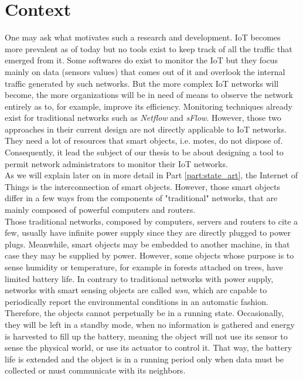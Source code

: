 \section*{Context}

One may ask what motivates such a research and development. IoT becomes more prevalent as of today but no tools exist to keep track of all the traffic that emerged from it. Some softwares do exist to monitor the IoT but they focus mainly on data (sensors values) that comes out of it and overlook the internal traffic generated by such networks. But the more complex IoT networks will become, the more organizations will be in need of means to observe the network entirely as to, for example, improve its efficiency. Monitoring techniques already exist for traditional networks such as \textit{Netflow} and \textit{sFlow}. However, those two approaches in their current design are not directly applicable to IoT networks. They need a lot of resources that smart objects, i.e. motes, do not dispose of. Consequently, it lead the subject of our thesis to be about designing a tool to permit network administrators to monitor their IoT networks.\\

As we will explain later on in more detail in Part \ref{part:state_art}, the Internet of Things is the interconnection of smart objects. However, those smart objects differ in a few ways from the components of "traditional" networks, that are mainly composed of powerful computers and routers.\\

Those traditional networks, composed by computers, servers and routers to cite a few, usually have infinite power supply since they are directly plugged to power plugs. Meanwhile, smart objects may be embedded to another machine, in that case they may be supplied by power. However, some objects whose purpose is to sense humidity or temperature, for example in forests attached on trees, have limited battery life. In contrary to traditional networks with power supply, networks with smart sensing objects are called \textit{\acrfull{wsn}}, which are capable to periodically report the environmental conditions in an automatic fashion. Therefore, the objects cannot perpetually be in a running state. Occasionally, they will be left in a standby mode, when no information is gathered and energy is harvested to fill up the battery, meaning the object will not use its sensor to sense the physical world, or use its actuator to control it. That way, the battery life is extended and the object is in a running period only when data must be collected or must communicate with its neighbors. \\

